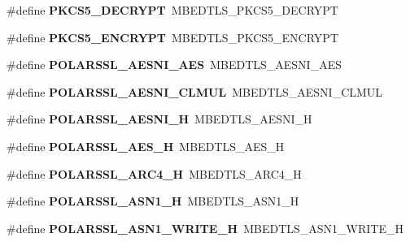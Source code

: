\begin{DoxyCompactItemize}
\#define {\bfseries P\+K\+C\+S5\+\_\+\+D\+E\+C\+R\+Y\+PT}~M\+B\+E\+D\+T\+L\+S\+\_\+\+P\+K\+C\+S5\+\_\+\+D\+E\+C\+R\+Y\+PT
\item 
\mbox{\label{compat-1_83_8h_ad5ad0d9541143890a55d7fc7b72d9709}} 
\#define {\bfseries P\+K\+C\+S5\+\_\+\+E\+N\+C\+R\+Y\+PT}~M\+B\+E\+D\+T\+L\+S\+\_\+\+P\+K\+C\+S5\+\_\+\+E\+N\+C\+R\+Y\+PT
\item 
\mbox{\label{compat-1_83_8h_a00d73908998e6cbd968282e4cd975a33}} 
\#define {\bfseries P\+O\+L\+A\+R\+S\+S\+L\+\_\+\+A\+E\+S\+N\+I\+\_\+\+A\+ES}~M\+B\+E\+D\+T\+L\+S\+\_\+\+A\+E\+S\+N\+I\+\_\+\+A\+ES
\item 
\mbox{\label{compat-1_83_8h_a5835d24a13489804c4f9880468a292e2}} 
\#define {\bfseries P\+O\+L\+A\+R\+S\+S\+L\+\_\+\+A\+E\+S\+N\+I\+\_\+\+C\+L\+M\+UL}~M\+B\+E\+D\+T\+L\+S\+\_\+\+A\+E\+S\+N\+I\+\_\+\+C\+L\+M\+UL
\item 
\mbox{\label{compat-1_83_8h_ab390e2103cde39009ee3e49e6e271bff}} 
\#define {\bfseries P\+O\+L\+A\+R\+S\+S\+L\+\_\+\+A\+E\+S\+N\+I\+\_\+H}~M\+B\+E\+D\+T\+L\+S\+\_\+\+A\+E\+S\+N\+I\+\_\+H
\item 
\mbox{\label{compat-1_83_8h_afa16cf2af588b4addff7291bcce41729}} 
\#define {\bfseries P\+O\+L\+A\+R\+S\+S\+L\+\_\+\+A\+E\+S\+\_\+H}~M\+B\+E\+D\+T\+L\+S\+\_\+\+A\+E\+S\+\_\+H
\item 
\mbox{\label{compat-1_83_8h_ae2ff913608b38bc7dbfb4d4565833a2c}} 
\#define {\bfseries P\+O\+L\+A\+R\+S\+S\+L\+\_\+\+A\+R\+C4\+\_\+H}~M\+B\+E\+D\+T\+L\+S\+\_\+\+A\+R\+C4\+\_\+H
\item 
\mbox{\label{compat-1_83_8h_a6c3a88efcf8d960e20fc37639e5088f7}} 
\#define {\bfseries P\+O\+L\+A\+R\+S\+S\+L\+\_\+\+A\+S\+N1\+\_\+H}~M\+B\+E\+D\+T\+L\+S\+\_\+\+A\+S\+N1\+\_\+H
\item 
\mbox{\label{compat-1_83_8h_a7cde479565f8697d80d44d054e78e300}} 
\#define {\bfseries P\+O\+L\+A\+R\+S\+S\+L\+\_\+\+A\+S\+N1\+\_\+\+W\+R\+I\+T\+E\+\_\+H}~M\+B\+E\+D\+T\+L\+S\+\_\+\+A\+S\+N1\+\_\+\+W\+R\+I\+T\+E\+\_\+H
\item 
\mbox{\label{compat-1_83_8h_a70e36b97d27417b6e4ab091924523d4d}} 

\end{DoxyCompactItemize}
